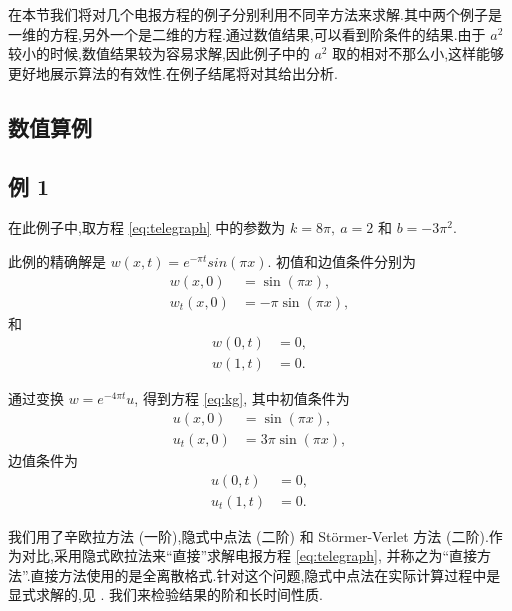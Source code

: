 在本节我们将对几个电报方程的例子分别利用不同辛方法来求解.其中两个例子是一维的方程,另外一个是二维的方程.通过数值结果,可以看到阶条件的结果.由于 $a^2$ 较小的时候,数值结果较为容易求解,因此例子中的 $a^2$ 取的相对不那么小,这样能够更好地展示算法的有效性.在例子结尾将对其给出分析.

\subsection{数值算例}

\subsection*{例 1}
在此例子中,取方程 \eqref{eq:telegraph} 中的参数为 $k = 8\pi,~a = 2$ 和 $b
= -3\pi^2$.

此例的精确解是 $w(x,t) = e^{-\pi t}sin(\pi x)$. 初值和边值条件分别为
\begin{equation*}
\begin{aligned}
w(x,0)&=\sin(\pi x),\\
w_t(x,0)&=-\pi \sin(\pi x),
\end{aligned}
\end{equation*}
和
\begin{equation*}
\begin{aligned}
w(0,t)&=0,\\
w(1,t)&=0.
\end{aligned}
\end{equation*}

通过变换 $w = e^{-4\pi t}u$, 得到方程 \eqref{eq:kg}, 其中初值条件为
\begin{equation*}
\begin{aligned}
u(x,0)&=\sin(\pi x),\\
u_t(x,0)&=3\pi \sin(\pi x),
\end{aligned}
\end{equation*}
边值条件为
\begin{equation*}
\begin{aligned}
u(0,t)&=0,\\
u_t(1,t)&=0.
\end{aligned}
\end{equation*}

我们用了辛欧拉方法 (一阶),隐式中点法 (二阶) 和 St\"{o}rmer-Verlet 方法 (二阶).作为对比,采用隐式欧拉法来``直接''求解电报方程 \eqref{eq:telegraph}, 并称之为``直接方法''.直接方法使用的是全离散格式.针对这个问题,隐式中点法在实际计算过程中是显式求解的,见 \cite{feng2010symplectic}. 我们来检验结果的阶和长时间性质.

